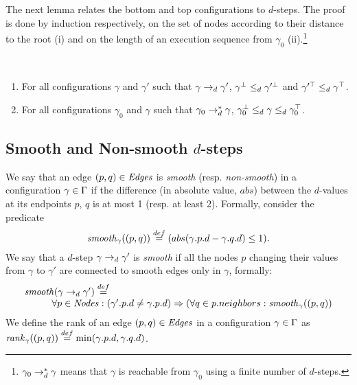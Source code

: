 The next lemma relates the bottom and top configurations to $d$-steps.
The proof is done by induction respectively, on the set of nodes
according to their distance to the root (i) and on the length of an
execution sequence from $\gamma_0$ (ii).\footnote{$\gamma_0 \rightarrow_d^*
\gamma$ means that $\gamma$ is reachable from $\gamma_0$ using a
finite number of $d$-steps.}
\begin{lemma}\label{lemma:bounds:dstep} ~
  
  \begin{enumerate}[label=(\roman*)]  
  \item For all configurations $\gamma$ and $\gamma'$ such that
  $\gamma \rightarrow_d \gamma'$, $\gamma^{\bot} \le_d \gamma'^{\bot}$ and
  $\gamma'^{\top} \le_d \gamma^{\top}$.

  \item For all configurations $\gamma_0$ and $\gamma$ such that
  $\gamma_0 \rightarrow_d^* \gamma$,
  $\gamma_0^{\bot} \le_d \gamma \le_d \gamma_0^{\top}$.

  \end{enumerate}
\end{lemma}

\subsection{Smooth and Non-smooth $d$-steps}
\label{sec:dstep-potential:smooth}

We say that an edge $(p,q)\in\mathit{Edges}$ is \emph{smooth}
(resp. \emph{non-smooth}) in a configuration $\gamma\in\Gamma$ if the
difference (in absolute value, $abs$) between the $d$-values at its
endpoints $p$, $q$ is at most 1 (resp. at least 2).  Formally,
consider the predicate
%
$$\mathit{smooth}_{\gamma}((p,q)) \stackrel{def}= (abs(\gamma.p.d - \gamma.q.d) \le 1).$$
%
We say that a $d$-step $\gamma \rightarrow_d \gamma'$ is \emph{smooth} if all the
nodes $p$ changing their values from $\gamma$ to $\gamma'$ are
connected to smooth edges only in $\gamma$, formally:
%
$$\begin{array}{l}
  \mathit{smooth}(\gamma \rightarrow_d \gamma') \stackrel{def}= \\
  \hspace{1cm} \forall p \in \mathit{Nodes}: (\gamma'.p.d \not= \gamma.p.d) \Rightarrow
  (\forall q \in p.neighbors: \mathit{smooth}_{\gamma}((p,q))
\end{array}$$
%
We define the rank of an edge $(p,q)\in\mathit{Edges}$ in a configuration
$\gamma\in\Gamma$ as
$\mathit{rank}_{\gamma}((p,q)) \stackrel{def}= \min(\gamma.p.d, \gamma.q.d)$.



